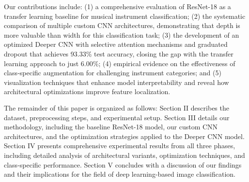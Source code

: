 Our contributions include: (1) a comprehensive evaluation of ResNet-18 as a transfer learning baseline for musical instrument classification; (2) the systematic comparison of multiple custom CNN architectures, demonstrating that depth is more valuable than width for this classification task; (3) the development of an optimized Deeper CNN with selective attention mechanisms and graduated dropout that achieves 93.33\% test accuracy, closing the gap with the transfer learning approach to just 6.00\%; (4) empirical evidence on the effectiveness of class-specific augmentation for challenging instrument categories; and (5) visualization techniques that enhance model interpretability and reveal how architectural optimizations improve feature localization.

The remainder of this paper is organized as follows: Section II describes the dataset, preprocessing steps, and experimental setup. Section III details our methodology, including the baseline ResNet-18 model, our custom CNN architectures, and the optimization strategies applied to the Deeper CNN model. Section IV presents comprehensive experimental results from all three phases, including detailed analysis of architectural variants, optimization techniques, and class-specific performance. Section V concludes with a discussion of our findings and their implications for the field of deep learning-based image classification.
